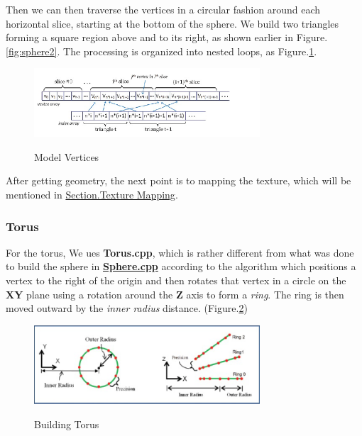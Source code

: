 \documentclass[12pt]{article}
\numberwithin{figure}{subsection}
\numberwithin{table}{subsection}
\numberwithin{equation}{subsection}
\begin{document}
Then we can then traverse the vertices in a circular fashion around each horizontal
slice, starting at the bottom of the sphere. We build two 
triangles forming a square region above and to its right, as shown earlier in
Figure.\ref{fig:sphere2}. 
The processing is organized into nested loops, as Figure.\ref{fig:vertices}.
    \begin{figure}[!htbp]
        \centering
        \includegraphics[width=0.75\textwidth]{image/vertices.png}
        \caption{Model Vertices}
        \label{fig:vertices}
        \cite{alma991002986248905076}
    \end{figure}

After getting geometry, the next point is to mapping the texture, which will be mentioned 
in \hyperref[sec:mapping]{Section.Texture Mapping}.

\subsubsection{Torus}
For the torus, 
We ues \textbf{Torus.cpp}, which is rather different from
what was done to build the sphere in \hyperref[sec:sphere]{\textbf{Sphere.cpp}} according to the algorithm which 
positions a vertex to the right of the origin and then rotates that vertex in a circle on the 
\textbf{XY} plane using a rotation around the \textbf{Z} axis to form a \emph{ring}. 
The ring is then moved outward by the \emph{inner radius} distance.
(Figure.\ref{fig:building toruss})
\begin{figure}[!htbp]
    \centering
    \includegraphics[width=0.75\textwidth]{image/building torus.png}
    \caption{Building Torus}
    \label{fig:building toruss}
    \cite{alma991002986248905076}
\end{figure}
\end{document}
